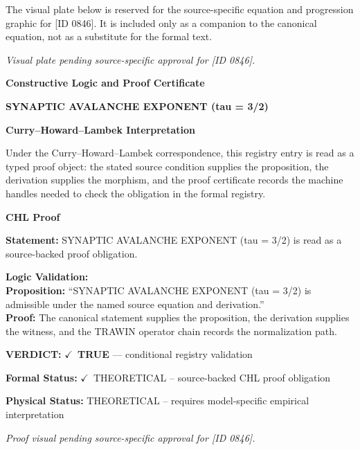 \begingroup\footnotesize\sloppy
The visual plate below is reserved for the source-specific equation and progression graphic for [ID 0846]. It is included only as a companion to the canonical equation, not as a substitute for the formal text.
\par\endgroup
\begingroup\footnotesize\itshape
Visual plate pending source-specific approval for [ID 0846].
\par\endgroup

\clearpage
\begingroup\tzpsupportsetup
\noindent\textbf{\fontsize{10.8pt}{12.8pt}\selectfont [ID 0846] Constructive Logic and Proof Certificate}\par
\noindent\textbf{\fontsize{10pt}{12pt}\selectfont SYNAPTIC AVALANCHE EXPONENT (tau = 3/2)}\par
\vspace{0.45em}
\begingroup
\footnotesize
\setlength{\parskip}{0.22em}
\setlength{\parindent}{0pt}
\noindent\textbf{Curry--Howard--Lambek Interpretation}\par
Under the Curry--Howard--Lambek correspondence, this registry entry is read as a typed proof
object: the stated source condition supplies the proposition, the derivation supplies the
morphism, and the proof certificate records the machine handles needed to check the obligation
in the formal registry.

\vspace{0.45em}
\noindent\textbf{CHL Proof}\par
\textbf{Statement:} SYNAPTIC AVALANCHE EXPONENT (tau = 3/2) is read as a source-backed proof obligation.

\textbf{Logic Validation:}\\
\textbf{Proposition:} ``SYNAPTIC AVALANCHE EXPONENT (tau = 3/2) is admissible under the named source equation and derivation.''\\
\textbf{Proof:} The canonical statement supplies the proposition, the derivation supplies the witness, and the TRAWIN operator chain records the normalization path.

\textbf{VERDICT:} \ensuremath{\checkmark}\ \textbf{TRUE} --- conditional registry validation

\textbf{Formal Status:} \ensuremath{\checkmark}\ THEORETICAL -- source-backed CHL proof obligation

\textbf{Physical Status:} THEORETICAL -- requires model-specific empirical interpretation
\par\vspace{0.45em}
\par
\vfill
\begingroup\footnotesize\itshape
Proof visual pending source-specific approval for [ID 0846].
\par\endgroup
\vfill
\endgroup
\endgroup
